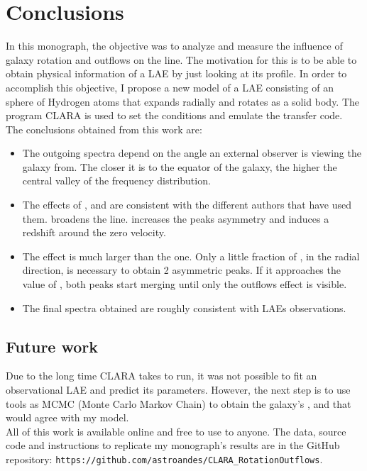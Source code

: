 \setcounter{equation}{0}
\chapter{Conclusions}
In this monograph, the objective was to analyze and measure the influence of galaxy rotation and outflows on the \lya line. The motivation for this is to be able to obtain physical information of a LAE by just looking at its \lya profile. In order to accomplish this objective, I propose a new model of a LAE consisting of an sphere of Hydrogen atoms that expands radially and rotates as a solid body. The program CLARA \cite{CLARA} is used to set the conditions and emulate the transfer code. \\

The conclusions obtained from this work are: \\

\begin{itemize}
\item The outgoing spectra depend on the angle an external observer is viewing the galaxy from. The closer it is to the equator of the galaxy, the higher the central valley of the frequency distribution. \\

\item The effects of \vrot, \vout and \tauh are consistent with the different authors that have used them. \vrot broadens the \lya line. \vout increases the peaks asymmetry and \tauh induces a redshift around the zero velocity.\\

\item The \vrot effect is much larger than the \vout one. Only a little fraction of \vrot, in the radial direction, is necessary to obtain 2 asymmetric peaks. If it \vout approaches the value of \vrot, both peaks start merging until only the outflows effect is visible. \\

\item The final spectra obtained are roughly consistent with LAEs observations.  \\

\end{itemize}

\section{Future work}

Due to the long time CLARA takes to run, it was not possible to fit an observational LAE and predict its parameters. However, the next step is to use tools as MCMC (Monte Carlo Markov Chain) to obtain the galaxy's \tauh, \vrot and \vout that would agree with my model. \\

All of this work is available online and free to use to anyone. The data, source code and instructions to replicate my monograph's results are in the GitHub repository:  \texttt{https://github.com/astroandes/CLARA\_RotationOutflows}. \\
